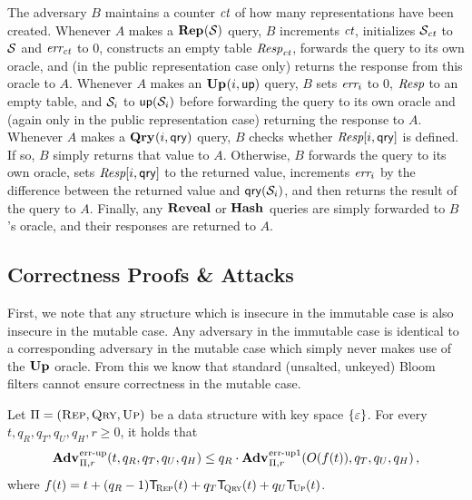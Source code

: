 The adversary $B$ maintains a counter $\textit{ct}$ of how many representations have been created. Whenever $A$ makes a $\mathbf{Rep}\hspace{0.5pt}(\mathcal{S})$ query, $B$ increments $\textit{ct}$, initializes $\mathcal{S}_{\textit{ct}}$ to $\mathcal{S}$ and $\textit{err}_{\textit{ct}}$ to 0, constructs an empty table $\textit{Resp}_{\textit{ct}}$, forwards the query to its own oracle, and (in the public representation case only) returns the response from this oracle to $A$. Whenever $A$ makes an $\mathbf{Up}\hspace{0.5pt}(i,\mathsf{up})$ query, $B$ sets $\textit{err}_i$ to 0, $\textit{Resp}$ to an empty table, and $\mathcal{S}_i$ to $\mathsf{up}(\mathcal{S}_i)$ before forwarding the query to its own oracle and (again only in the public representation case) returning the response to $A$. Whenever $A$ makes a $\mathbf{Qry}\hspace{0.5pt}(i,\mathsf{qry})$ query, $B$ checks whether $\textit{Resp}[i,\mathsf{qry}]$ is defined. If so, $B$ simply returns that value to $A$. Otherwise, $B$ forwards the query to its own oracle, sets $\textit{Resp}[i,\mathsf{qry}]$ to the returned value, increments $\textit{err}_i$ by the difference between the returned value and $\mathsf{qry}(\mathcal{S}_i)$, and then returns the result of the query to $A$. Finally, any $\mathbf{Reveal}$ or $\mathbf{Hash}\hspace{0.5pt}$ queries are simply forwarded to $B$'s oracle, and their responses are returned to $A$.

\subsection{Correctness Proofs \& Attacks}

First, we note that any structure which is insecure in the immutable case is also insecure in the mutable case. Any adversary in the immutable case is identical to a corresponding adversary in the mutable case which simply never makes use of the $\mathbf{Up}\hspace{0.5pt}$ oracle. From this we know that standard (unsalted, unkeyed) Bloom filters cannot ensure correctness in the mutable case.

\begin{lemma}\label{lemma:errep}
  Let $\mathrm{\Pi} = (\textsc{Rep}, \textsc{Qry}, \textsc{Up})$ be a data structure with key
  space $\{\varepsilon\}$. For every $t, q_R, q_T, q_U, q_H, r\geq 0$, it holds that
  \[
    \Adv{\errep}_{\struct,r}(t, q_R, q_T, q_U, q_H) \leq
    q_R\cdot\Adv{\errep1}_{\struct,r}(O(f(t)), q_T, q_U, q_H) \,,
  \]
  where $f(t) = t + (q_R-1)\ticks(\Rep,t) + q_T\ticks(\Qry,t) + q_U\ticks(\Up,t)$.
\end{lemma}

